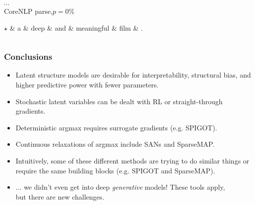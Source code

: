 \begin{frame}
\begin{columns}
\begin{column}{.5\textwidth}
{$\cdots$\\ CoreNLP parse,\quad$p=0\%$}\\
\begin{dependency}[mydep,arc angle=35]
\begin{deptext}[column sep=0.3cm]
$\star$ \& a \& deep \& and \& meaningful \& film \& . \\ \end{deptext}
\end{dependency}
\end{column}
\end{columns}
\end{frame}


\begin{frame}
\frametitle{Conclusions}
\begin{itemize}
\item Latent structure models are desirable for interpretability, structural bias, and higher predictive power with fewer parameters.
\item Stochastic latent variables can be dealt with RL or straight-through gradients.
\item Deterministic argmax requires surrogate gradients (e.g. SPIGOT).
\item Continuous relaxations of argmax include SANs and SparseMAP.
\item Intuitively, some of these different methods are trying to do similar
things or require the same building blocks (e.g. SPIGOT and
SparseMAP).\\[.5\baselineskip]
\item ... we didn't even get into deep \emph{generative} models! These tools
apply,\\but there are new challenges.
\citep{corro2018differentiable,rnng2,rnng1,segm}
\end{itemize}
\end{frame}

